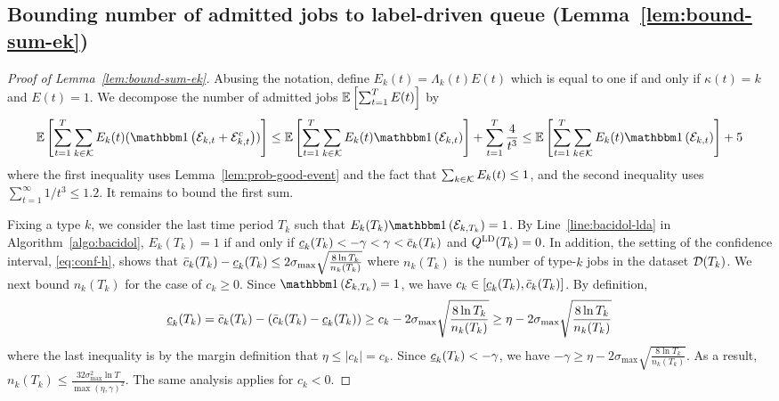 \subsection{Bounding number of admitted jobs to label-driven queue (Lemma~\ref{lem:bound-sum-ek})}\label{app:lem-bound-sum-ek}
\begin{proof}[Proof of Lemma~\ref{lem:bound-sum-ek}]
Abusing the notation, define $E_k(t) = \Lambda_k(t) E(t)$ which is equal to one if and only if $\kappa(t) = k$ and $E(t) = 1$. We decompose the number of admitted jobs $\mathbb E\left[\sum_{t=1}^T E(t)\right]$ by
\[
\expect{\sum_{t=1}^T\sum_{k \in \set{K}} E_k(t)(\indic{\set{E}_{k,t} + \set{E}_{k,t}^c})} \leq \expect{\sum_{t=1}^T\sum_{k \in \set{K}} E_k(t)\indic{\set{E}_{k,t}}} + \sum_{t=1}^T \frac{4}{t^3} \leq \expect{\sum_{t=1}^T\sum_{k \in \set{K}} E_k(t)\indic{\set{E}_{k,t}}} + 5
\]
where the first inequality uses Lemma~\ref{lem:prob-good-event} and the fact that $\sum_{k\in\mathcal{K}} E_k(t) \leq 1$, and the second inequality uses $\sum_{t=1}^{\infty} 1/t^3 \leq 1.2$. It remains to bound the first sum.

Fixing a type $k$, we consider the last time period $T_k$ such that $E_k(T_k)\indic{\set{E}_{k,T_k}} = 1$. By Line~\ref{line:bacidol-lda} in Algorithm~\ref{algo:bacidol}, $E_k(T_k) = 1$ if and only if $\underline{c}_k(T_k) < -\gamma < \gamma < \bar{c}_k(T_k)$ and $Q^{\mathcal{\textsc{LD}}}(T_k) = 0$. In addition, the setting of the confidence interval, \eqref{eq:conf-h}, shows that $\bar{c}_k(T_k) - \underline{c}_k(T_k) \leq 2\sigma_{\max}\sqrt{\frac{8\ln T_k}{n_k(T_k)}}$
where $n_k(T_k)$ is the number of type-$k$ jobs in the dataset $\mathcal{D}(T_k)$. We next bound $n_k(T_k)$ for the case of $c_k \geq 0$. Since $\indic{\set{E}_{k,T_k}} = 1$, we have $c_k \in [\underline{c}_k(T_k), \bar{c}_k(T_k)]$. By definition, 
\[
\underline{c}_k(T_k) = \bar{c}_k(T_k) - (\bar{c}_k(T_k) - \underline{c}_k(T_k)) \geq c_k - 2\sigma_{\max}\sqrt{\frac{8\ln T_k}{n_k(T_k)}} \geq \eta - 2\sigma_{\max}\sqrt{\frac{8\ln T_k}{n_k(T_k)}}
\]
where the last inequality is by the margin definition that $\eta \leq |c_k| = c_k$. Since $\underline{c}_k(T_k) < -\gamma$, we have $-\gamma \geq \eta - 2\sigma_{\max}\sqrt{\frac{8\ln T_k}{n_k(T_k)}}$. As a result, $n_k(T_k) \leq \frac{32\sigma^2_{\max}\ln T}{\max(\eta,\gamma)^2}$. The same analysis applies for $c_k < 0$.


\end{proof}
